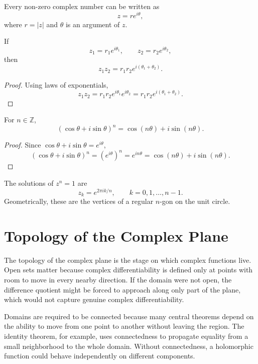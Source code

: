 \begin{corollary}
Every non-zero complex number can be written as
\[
    z=re^{i\theta},
\]
where $r=|z|$ and $\theta$ is an argument of $z$.
\end{corollary}

\begin{proposition}
If
\[
    z_1=r_1e^{i\theta_1},
    \qquad
    z_2=r_2e^{i\theta_2},
\]
then
\[
    z_1z_2=r_1r_2e^{i(\theta_1+\theta_2)}.
\]
\end{proposition}

\begin{proof}
Using laws of exponentials,
\[
    z_1z_2=r_1r_2e^{i\theta_1}e^{i\theta_2}=r_1r_2e^{i(\theta_1+\theta_2)}.
\]
\end{proof}

\begin{theorem}
For $n\in\mathbb{Z}$,
\[
    (\cos\theta+i\sin\theta)^n=\cos(n\theta)+i\sin(n\theta).
\]
\end{theorem}

\begin{proof}
Since $\cos\theta+i\sin\theta=e^{i\theta}$,
\[
    (\cos\theta+i\sin\theta)^n=(e^{i\theta})^n=e^{in\theta}=\cos(n\theta)+i\sin(n\theta).
\]
\end{proof}

\begin{example}
The solutions of $z^n=1$ are
\[
    z_k=e^{2\pi i k/n},\qquad k=0,1,\dots,n-1.
\]
Geometrically, these are the vertices of a regular $n$-gon on the unit circle.
\end{example}

\section{Topology of the Complex Plane}


The topology of the complex plane is the stage on which complex functions live. Open sets matter because complex differentiability is defined only at points with room to move in every nearby direction. If the domain were not open, the difference quotient might be forced to approach along only part of the plane, which would not capture genuine complex differentiability.

Domains are required to be connected because many central theorems depend on the ability to move from one point to another without leaving the region. The identity theorem, for example, uses connectedness to propagate equality from a small neighborhood to the whole domain. Without connectedness, a holomorphic function could behave independently on different components.

